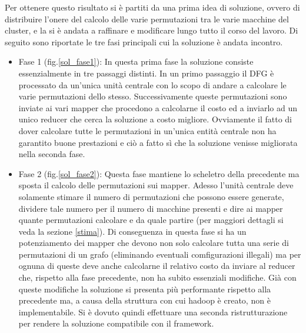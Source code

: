 \documentclass[]{IEEEtran}
\begin{document}
Per ottenere questo risultato si è partiti da una prima idea di soluzione, ovvero di distribuire l'onere del calcolo delle varie permutazioni tra le varie macchine del cluster, e la si è andata a raffinare e modificare lungo tutto il corso del lavoro. Di seguito sono riportate le tre fasi principali cui la soluzione è andata incontro.
\begin{itemize}
	\item Fase 1 (fig.\ref{sol_fase1}): In questa prima fase la soluzione consiste essenzialmente in tre passaggi distinti. In un primo passaggio il DFG è processato da un'unica unità centrale con lo scopo di andare a calcolare le varie permutazioni dello stesso. Successivamente queste permutazioni sono inviate ai vari mapper che procedono a calcolarne il costo ed a inviarlo ad un unico reducer che cerca la soluzione a costo migliore. Ovviamente il fatto di dover calcolare tutte le permutazioni in un'unica entità centrale non ha garantito buone prestazioni e ciò a fatto sì che la soluzione venisse migliorata nella seconda fase.
	
	\item Fase 2 (fig.\ref{sol_fase2}): Questa fase mantiene lo scheletro della precedente ma sposta il calcolo delle permutazioni sui mapper. Adesso l'unità centrale deve solamente stimare il numero di permutazioni che possono essere generate, dividere tale numero per il numero di macchine presenti e dire ai mapper quante permutazioni calcolare e da quale partire (per maggiori dettagli si veda la sezione \ref{stima}). Di conseguenza in questa fase si ha un potenziamento dei mapper che devono non solo calcolare tutta una serie di permutazioni di un grafo (eliminando eventuali comfigurazioni illegali) ma per ognuna di queste deve anche calcolarne il relativo costo da inviare al reducer che, rispetto alla fase precedente, non ha subito essenziali modifiche. Già con queste modifiche la soluzione si presenta più performante rispetto alla precedente ma, a causa della struttura con cui hadoop è creato, non è implementabile. Si è dovuto quindi effettuare una seconda ristrutturazione per rendere la soluzione compatibile con il framework.


\end{itemize}
\end{document}
